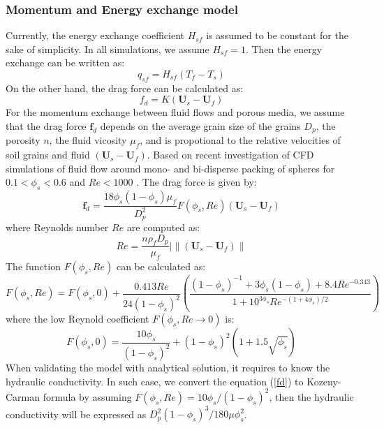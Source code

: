 \documentclass[preprint,12pt]{elsarticle}
\begin{document}
\subsubsection{Momentum and Energy exchange model}
Currently, the energy exchange coefficient $H_{sf}$ is assumed to be constant for the sake of simplicity. In all simulations, we assume $H_{sf}=1$.  Then the energy exchange can be written as:
%
%
\begin{equation}
     q_{sf} = H_{sf} (T_f -T_s)
\end {equation}
%
%
On the other hand, the drag force can be calculated as:
%
%
\begin{equation}
    f_{d} = K (\pmb{U}_s - \pmb{U}_f)  
\end {equation}
%
%
For the momentum exchange between fluid flows and porous media, we assume that the drag force $\pmb{f}_{d}$ depends on the average grain size of the grains $D_p$, the porosity $n$, the fluid vicosity $\mu_f$, and is propotional to the relative velocities of soil grains and fluid $(\pmb{U}_s - \pmb{U}_f)$. Based on recent investigation of CFD simulations of fluid flow around mono- and bi-disperse packing of spheres for $0.1 < \phi_s < 0.6$ and $Re < 1000$ \cite{Drag}. The drag force is given by: \\
%
%
\begin{equation}
     \pmb{f}_{d} = \frac{18\phi_s(1-\phi_s)\mu_f}{D_p^2} F(\phi_s, Re) (\pmb{U}_s - \pmb{U}_f)  
\label{fd}
\end {equation}
%
%
where Reynolds number $Re$ are computed as:
%
%
\begin{equation}
     Re = \frac{n \rho_f D_p}{\mu_f} |\big\|(\pmb{U}_s - \pmb{U}_f)\big\|
\end {equation}
%
%
The function $F(\phi_s, Re)$ can be calculated as:
%
%
\begin{equation}
     F(\phi_s, Re)  = F(\phi_s, 0)  + \frac{0.413Re}{24 (1-\phi_s)^2} (\frac{(1-\phi_s)^{-1}+3\phi_s(1-\phi_s)+8.4Re^{-0.343}}{1+10^{3\phi_s}Re^{-(1+4\phi_s)/2}})
\end {equation}
%
%
where the low Reynold coefficient $ F(\phi_s, Re\rightarrow0)$ is:
%
%
\begin{equation}
     F(\phi_s, 0)  = \frac{10\phi_s}{ (1-\phi_s)^2}+(1-\phi_s)^2(1+1.5\sqrt{\phi_s})
\end {equation}
%
%
When validating the model with analytical solution, it requires to know the hydraulic conductivity. In such case, we convert the equation (\ref{fd}) to Kozeny-Carman formula by assuming $F(\phi_s, Re) = 10\phi_s/(1-\phi_s)^2$, then the hydraulic conductivity will be expressed as  $D_p^2 (1-\phi_s)^3 / 180 \mu \phi_s^2$.
\end{document}
